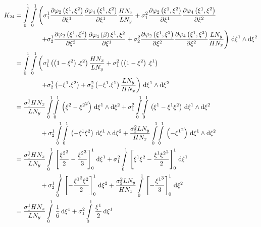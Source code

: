 \begin{equation}
  \begin{aligned}
    K_{24}&=\dintl{0}{1}\dintl{0}{1}\left(
    \conductivitytensorsymbol^{1}_{1}\delby{\lbfn{2}{\xione,\xitwo}}{\xione}
    \delby{\lbfn{4}{\xione,\xitwo}}{\xione}\dfrac{H N_{x}}{L N_{y}}+
    \conductivitytensorsymbol^{2}_{1}\delby{\lbfn{2}{\xione,\xitwo}}{\xione}
    \delby{\lbfn{4}{\xione,\xitwo}}{\xitwo}\right.\\
    &\qquad\qquad\left.+\conductivitytensorsymbol^{1}_{2}\delby{\lbfn{2}{\xione,\xitwo}}{\xitwo}
    \delby{\lbfn{4}{\beta}{\xione,\xitwo}}{\xione}+
    \conductivitytensorsymbol^{2}_{2}\delby{\lbfn{2}{\xione,\xitwo}}{\xitwo}
    \delby{\lbfn{4}{\xione,\xitwo}}{\xitwo}\dfrac{L N_{y}}{H N_{x}}\right)\infinitesimaltwo{\xione}{\xitwo}\\
    &=\dintl{0}{1}\dintl{0}{1}\left(
    \conductivitytensorsymbol^{1}_{1}\pbrac{\pbrac{1-\xitwo}.\xitwo}\dfrac{H N_{x}}{L N_{y}}+
    \conductivitytensorsymbol^{2}_{1}\pbrac{\pbrac{1-\xitwo}.\xione}\right.\\
    &\qquad\qquad\left.+\conductivitytensorsymbol^{1}_{2}\pbrac{-\xione.\xitwo}+
    \conductivitytensorsymbol^{2}_{2}\pbrac{-\xione.\xione}\dfrac{L N_{y}}{H N_{x}}\right)
    \infinitesimaltwo{\xione}{\xitwo}\\
    &=\dfrac{\conductivitytensorsymbol^{1}_{1} H N_{x}}{L N_{y}}\giint{0}{1}{0}{1}{\pbrac{\xitwo-\xitwosq}}{\xione}{\xitwo}
    +\conductivitytensorsymbol^{2}_{1}\giint{0}{1}{0}{1}{\pbrac{\xione-\xione\xitwo}}{\xione}{\xitwo}\\
    &\qquad\qquad+\conductivitytensorsymbol^{1}_{2}\giint{0}{1}{0}{1}{\pbrac{-\xione\xitwo}}{\xione}{\xitwo}
    +\dfrac{\conductivitytensorsymbol^{2}_{2} L N_{y}}{H N_{x}}\giint{0}{1}{0}{1}{\pbrac{-\xionesq}}{\xione}{\xitwo} \\
    &=\dfrac{\conductivitytensorsymbol^{1}_{1} H N_{x}}{L N_{y}}\gint{0}{1}{\sqbrac{\dfrac{\xitwosq}{2}-\dfrac{\xitwocube}{3}}^{1}_{0}}{\xione}
    +\conductivitytensorsymbol^{2}_{1}\gint{0}{1}{\sqbrac{\xione\xitwo-\dfrac{\xione\xitwosq}{2}}^{1}_{0}}{\xione}\\
    &\qquad\qquad+\conductivitytensorsymbol^{1}_{2}\gint{0}{1}{\sqbrac{-\dfrac{\xionesq\xitwo}{2}}^{1}_{0}}{\xitwo}
    +\dfrac{\conductivitytensorsymbol^{2}_{2} L N_{y}}{H N_{x}}\gint{0}{1}{\sqbrac{-\dfrac{\xionecube}{3}}^{1}_{0}}{\xitwo} \\
    &=\dfrac{\conductivitytensorsymbol^{1}_{1} H N_{x}}{L N_{y}}\gint{0}{1}{\dfrac{1}{6}}{\xione}
    +\conductivitytensorsymbol^{2}_{1}\gint{0}{1}{\dfrac{\xione}{2}}{\xione}

\end{aligned}
\end{equation}
